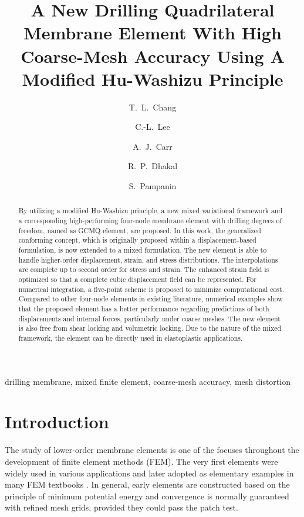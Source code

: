 \documentclass[3p,sort&compress,review,11pt]{elsarticle}
\begin{document}
\linenumbers
\begin{abstract}
By utilizing a modified Hu-Washizu principle, a new mixed variational framework and a corresponding high-performing four-node membrane element with drilling degrees of freedom, named as GCMQ element, are proposed. In this work, the generalized conforming concept, which is originally proposed within a displacement-based formulation, is now extended to a mixed formulation. The new element is able to handle higher-order displacement, strain, and stress distributions. The interpolations are complete up to second order for stress and strain. The enhanced strain field is optimized so that a complete cubic displacement field can be represented. For numerical integration, a five-point scheme is proposed to minimize computational cost. Compared to other four-node elements in existing literature, numerical examples show that the proposed element has a better performance regarding predictions of both displacements and internal forces, particularly under coarse meshes. The new element is also free from shear locking and volumetric locking. Due to the nature of the mixed framework, the element can be directly used in elastoplastic applications.
\end{abstract}
\begin{keyword}
drilling membrane\sep
mixed finite element\sep
coarse-mesh accuracy\sep
mesh distortion
\end{keyword}
\begin{frontmatter}
\title{A New Drilling Quadrilateral Membrane Element With High Coarse-Mesh Accuracy Using A Modified Hu-Washizu Principle}
\author[add1]{T.~L.~Chang}
\author[add1]{C.-L.~Lee}
\author[add1]{A.~J.~Carr}
\author[add1]{R.~P.~Dhakal}
\author[add1]{S.~Pampanin}
\address[add1]{Department of Civil and Natural Resources Engineering, University of Canterbury, Christchurch, NZ, 8041.}
\end{frontmatter}
\section{Introduction}
The study of lower-order membrane elements is one of the focuses throughout the development of finite element methods (FEM). The very first elements \citep[e.g.,][]{Turner1956,Taig1964} were widely used in various applications and later adopted as elementary examples in many FEM textbooks \citep[e.g.,][]{Zienkiewicz2013}. In general, early elements are constructed based on the principle of minimum potential energy and convergence is normally guaranteed with refined mesh grids, provided they could pass the patch test.
\end{document}
